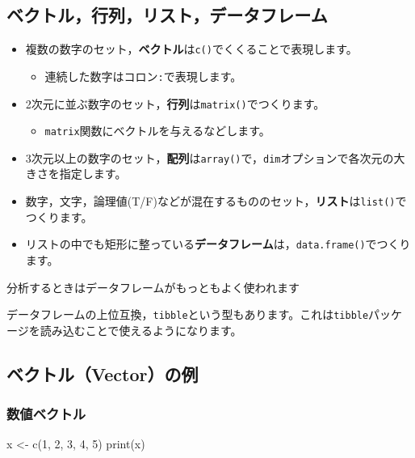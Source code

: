 \documentclass[
  a4paper,
]{ltjsbook}
\newenvironment{Shaded}{\begin{snugshade}}{\end{snugshade}}
\newcommand{\DecValTok}[1]{\textcolor[rgb]{0.68,0.00,0.00}{#1}}
\newcommand{\FunctionTok}[1]{\textcolor[rgb]{0.28,0.35,0.67}{#1}}
\newcommand{\NormalTok}[1]{\textcolor[rgb]{0.00,0.23,0.31}{#1}}
\newcommand{\OtherTok}[1]{\textcolor[rgb]{0.00,0.23,0.31}{#1}}
\providecommand{\tightlist}{%
  \setlength{\itemsep}{0pt}\setlength{\parskip}{0pt}}\usepackage{longtable,booktabs,array}
\begin{document}
\subsection{ベクトル，行列，リスト，データフレーム}\label{ux30d9ux30afux30c8ux30ebux884cux5217ux30eaux30b9ux30c8ux30c7ux30fcux30bfux30d5ux30ecux30fcux30e0}

\begin{itemize}
\tightlist
\item
  複数の数字のセット，\textbf{ベクトル}は\texttt{c()}でくくることで表現します。

  \begin{itemize}
  \tightlist
  \item
    連続した数字はコロン\texttt{:}で表現します。
  \end{itemize}
\item
  2次元に並ぶ数字のセット，\textbf{行列}は\texttt{matrix()}でつくります。

  \begin{itemize}
  \tightlist
  \item
    \texttt{matrix}関数にベクトルを与えるなどします。
  \end{itemize}
\item
  3次元以上の数字のセット，\textbf{配列}は\texttt{array()}で，\texttt{dim}オプションで各次元の大きさを指定します。
\item
  数字，文字，論理値(T/F)などが混在するもののセット，\textbf{リスト}は\texttt{list()}でつくります。
\item
  リストの中でも矩形に整っている\textbf{データフレーム}は，\texttt{data.frame()}でつくります。
\end{itemize}

分析するときはデータフレームがもっともよく使われます

データフレームの上位互換，\texttt{tibble}という型もあります。これは\texttt{tibble}パッケージを読み込むことで使えるようになります。

\subsection{ベクトル（Vector）の例}\label{ux30d9ux30afux30c8ux30ebvectorux306eux4f8b}

\subsubsection{数値ベクトル}\label{ux6570ux5024ux30d9ux30afux30c8ux30eb}

\begin{Shaded}
\begin{Highlighting}[]
\NormalTok{x }\OtherTok{\textless{}{-}} \FunctionTok{c}\NormalTok{(}\DecValTok{1}\NormalTok{, }\DecValTok{2}\NormalTok{, }\DecValTok{3}\NormalTok{, }\DecValTok{4}\NormalTok{, }\DecValTok{5}\NormalTok{)}
\FunctionTok{print}\NormalTok{(x)}
\end{Highlighting}
\end{Shaded}
\end{document}
